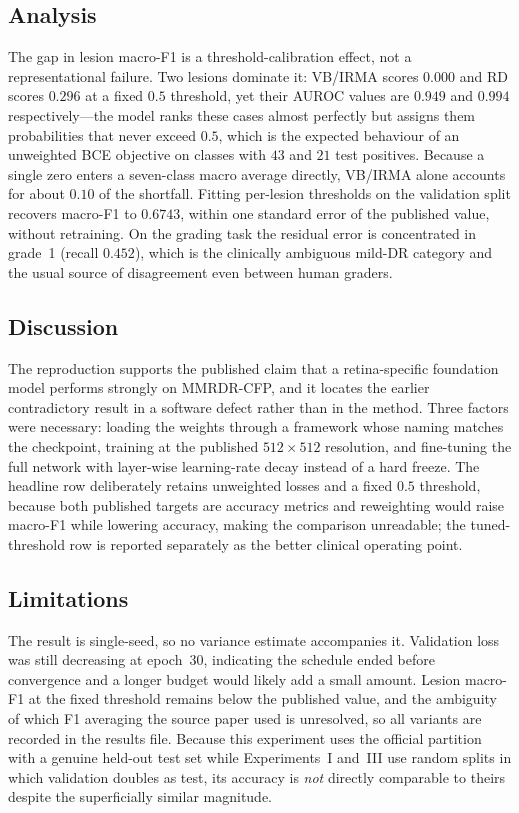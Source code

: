 \documentclass[journal,twoside,web]{ieeecolor}
\begin{document}
\subsection{Analysis}
The gap in lesion macro-F1 is a threshold-calibration effect, not a representational
failure. Two lesions dominate it: VB/IRMA scores $0.000$ and RD scores $0.296$ at a fixed
$0.5$ threshold, yet their AUROC values are $0.949$ and $0.994$ respectively---the model
ranks these cases almost perfectly but assigns them probabilities that never exceed
$0.5$, which is the expected behaviour of an unweighted BCE objective on classes with $43$
and $21$ test positives. Because a single zero enters a seven-class macro average
directly, VB/IRMA alone accounts for about $0.10$ of the shortfall. Fitting per-lesion
thresholds on the validation split recovers macro-F1 to $0.6743$, within one standard
error of the published value, without retraining. On the grading task the residual error
is concentrated in grade~1 (recall $0.452$), which is the clinically ambiguous mild-DR
category and the usual source of disagreement even between human graders.

\subsection{Discussion}
The reproduction supports the published claim that a retina-specific foundation model
performs strongly on MMRDR-CFP, and it locates the earlier contradictory result in a
software defect rather than in the method. Three factors were necessary: loading the
weights through a framework whose naming matches the checkpoint, training at the
published $512\times512$ resolution, and fine-tuning the full network with layer-wise
learning-rate decay instead of a hard freeze. The headline row deliberately retains
unweighted losses and a fixed $0.5$ threshold, because both published targets are
accuracy metrics and reweighting would raise macro-F1 while lowering accuracy, making the
comparison unreadable; the tuned-threshold row is reported separately as the better
clinical operating point.

\subsection{Limitations}
The result is single-seed, so no variance estimate accompanies it. Validation loss was
still decreasing at epoch~$30$, indicating the schedule ended before convergence and a
longer budget would likely add a small amount. Lesion macro-F1 at the fixed threshold
remains below the published value, and the ambiguity of which F1 averaging the source
paper used is unresolved, so all variants are recorded in the results file. Because this
experiment uses the official partition with a genuine held-out test set while
Experiments~I and~III use random splits in which validation doubles as test, its accuracy
is \emph{not} directly comparable to theirs despite the superficially similar magnitude.
\end{document}
